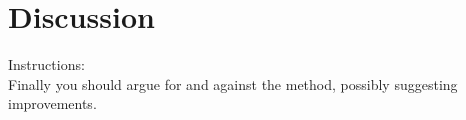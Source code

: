 \section{Discussion}
Instructions:\\
Finally you should argue for and against the method, possibly suggesting improvements.